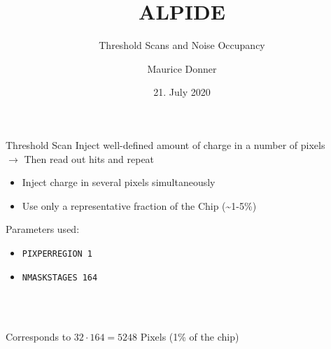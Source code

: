 \documentclass{beamer}
\title{\texorpdfstring{\color{blue!50!black}\textbf{ALPIDE}}{}}
\subtitle{Threshold Scans and Noise Occupancy}
\author{Maurice Donner}
\date{21. July 2020}
\begin{document}
\maketitle

\begin{frame}{Threshold Scan}
    Inject well-defined amount of charge in a number of pixels\\
    \( \rightarrow \) Then read out hits and repeat
    \begin{itemize}
	\item Inject charge in several pixels simultaneously
	\item Use only a representative fraction of the Chip (\textasciitilde 1-5\%) \\[1cm]
    \end{itemize}
    \begin{minipage}{.35\textwidth}
	
    Parameters used:
    \begin{itemize}
	\item \texttt{PIXPERREGION 1}
	\item \texttt{NMASKSTAGES 164}
    \end{itemize}
    \end{minipage}
    \begin{minipage}{.05\textwidth}
	\ \\[0.5cm]
    \end{minipage}
    \begin{minipage}{.57\textwidth}
    \tiny
    \ \\[0.4cm]
    Corresponds to \( 32 \cdot 164 = 5248 \) Pixels (1\% of the chip)
    \end{minipage}
\end{frame}
\end{document}
